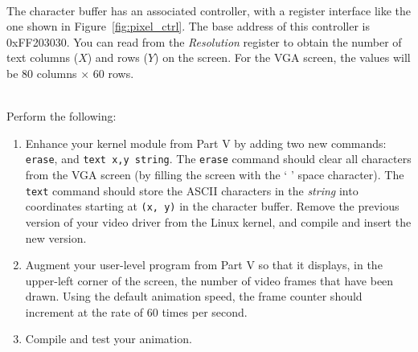 \documentclass[epsfig,10pt,fullpage]{article}
\newcommand{\CommonDocsPath}{../../common/docs}
\begin{document}
~\\
\noindent
The character buffer has an associated controller, with a
register interface like the one shown in Figure~\ref{fig:pixel_ctrl}. The base address of
this controller is {\sf 0xFF203030}.  You can read from the
{\it Resolution} register to obtain the number of text columns ($X$) and rows ($Y$) on
the screen. For the VGA screen, the values will be 80 columns $\times$ 60 rows.

~\\
\noindent
Perform the following:

\begin{enumerate}
\item Enhance your kernel module from Part V by adding two new commands: \texttt{erase}, and 
\texttt{text x,y string}. The \texttt{erase} command should clear all characters from the VGA 
screen (by filling the screen with the ` ' space character).
The \texttt{text} command should store the ASCII characters in the {\it string} into coordinates
starting at \texttt{(x, y)} in the character buffer. Remove the previous version of your 
video driver from the Linux kernel, and compile and insert the new version.
\item Augment your user-level program from Part V so that it displays, in the upper-left corner 
of the screen, the number of video frames that have been drawn. Using the default animation speed,
the frame counter should increment at the rate of 60 times per second.
\item Compile and test your animation.
\end{enumerate}

\vskip 0.8in
\noindent
\newpage

\end{document}
